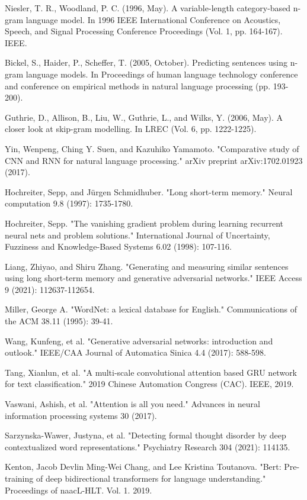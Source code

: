 \documentclass[fleqn,10pt]{thescipub} %
\begin{document}
\begin{enumerate}
Niesler, T. R., Woodland, P. C. (1996, May). A variable-length category-based n-gram language model. In 1996 IEEE International Conference on Acoustics, Speech, and Signal Processing Conference Proceedings (Vol. 1, pp. 164-167). IEEE.

Bickel, S., Haider, P.,  Scheffer, T. (2005, October). Predicting sentences using n-gram language models. In Proceedings of human language technology conference and conference on empirical methods in natural language processing (pp. 193-200).

Guthrie, D., Allison, B., Liu, W., Guthrie, L., and Wilks, Y. (2006, May). A closer look at skip-gram modelling. In LREC (Vol. 6, pp. 1222-1225).

Yin, Wenpeng, Ching Y. Suen, and Kazuhiko Yamamoto. "Comparative study of CNN and RNN for natural language processing." arXiv preprint arXiv:1702.01923 (2017).

Hochreiter, Sepp, and Jürgen Schmidhuber. "Long short-term memory." Neural computation 9.8 (1997): 1735-1780.

Hochreiter, Sepp. "The vanishing gradient problem during learning recurrent neural nets and problem solutions." International Journal of Uncertainty, Fuzziness and Knowledge-Based Systems 6.02 (1998): 107-116.

Liang, Zhiyao, and Shiru Zhang. "Generating and measuring similar sentences using long short-term memory and generative adversarial networks." IEEE Access 9 (2021): 112637-112654.

Miller, George A. "WordNet: a lexical database for English." Communications of the ACM 38.11 (1995): 39-41.

Wang, Kunfeng, et al. "Generative adversarial networks: introduction and outlook." IEEE/CAA Journal of Automatica Sinica 4.4 (2017): 588-598.

Tang, Xianlun, et al. "A multi-scale convolutional attention based GRU network for text classification." 2019 Chinese Automation Congress (CAC). IEEE, 2019.

Vaswani, Ashish, et al. "Attention is all you need." Advances in neural information processing systems 30 (2017).

Sarzynska-Wawer, Justyna, et al. "Detecting formal thought disorder by deep contextualized word representations." Psychiatry Research 304 (2021): 114135.

Kenton, Jacob Devlin Ming-Wei Chang, and Lee Kristina Toutanova. "Bert: Pre-training of deep bidirectional transformers for language understanding." Proceedings of naacL-HLT. Vol. 1. 2019.


\end{enumerate}
\end{document}
